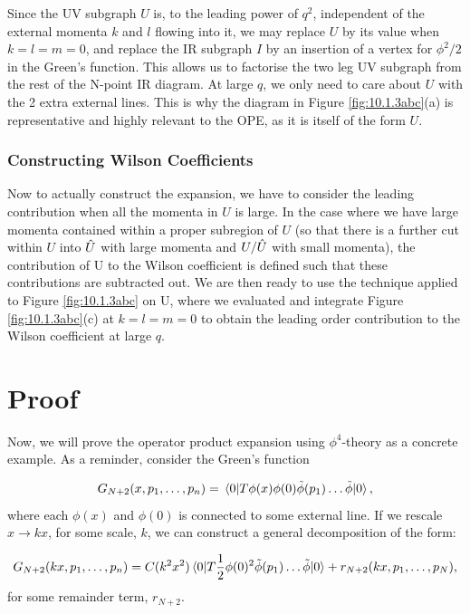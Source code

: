 \documentclass{article}
\begin{document}
Since the UV subgraph $U$ is, to the leading power of $q^2$, independent of the external momenta $k$ and $l$ flowing into it, we may replace $U$ by its value when $k=l=m=0$, and replace the IR subgraph $I$ by an insertion of a vertex for $\phi^2/2$ in the Green's function. This allows us to factorise the two leg UV subgraph from the rest of the N-point IR diagram. At large $q$, we only need to care about $U$ with the 2 extra external lines. This is why the diagram in Figure \ref{fig:10.1.3abc}(a) is representative and highly relevant to the OPE, as it is itself of the form $U$.

\subsubsection{Constructing Wilson Coefficients}
Now to actually construct the expansion, we have to consider the leading contribution when all the momenta in $U$ is large. In the case where we have large momenta contained within a proper subregion of $U$ (so that there is a further cut within $U$ into $\Hat{U}$ with large momenta and $U/\Hat{U}$ with small momenta), the contribution of U to the Wilson coefficient is defined such that these contributions are subtracted out. We are then ready to use the technique applied to Figure \ref{fig:10.1.3abc} on U, where we evaluated and integrate Figure \ref{fig:10.1.3abc}(c) at $k=l=m=0$ to obtain the leading order contribution to the Wilson coefficient at large $q$. 

\section{Proof} \label{proof}

Now, we will prove the operator product expansion using $\phi^4$-theory as a concrete example. As a reminder, consider the Green's function

\begin{equation}
    G_{N+2}(x, p_1,\dots, p_n) = \mel{0}{T\phi(x)\phi(0)\Tilde{\phi}(p_1)\dots\Tilde{\phi}}{0},
\end{equation}
where each $\phi(x)$ and $\phi(0)$ is connected to some external line. If we rescale $x \rightarrow kx$, for some scale, $k$, we can construct a general decomposition of the form:

\begin{equation}
    G_{N+2}(kx, p_1,\dots, p_n) = C(k^2x^2)\mel{0}{T\frac{1}{2}\phi(0)^2\Tilde{\phi}(p_1)\dots\Tilde{\phi}}{0} + r_{N+2}(kx,p_1,\dots,p_N),
    \label{green's decomposed}
\end{equation}
for some remainder term, $r_{N+2}$.     
\end{document}
